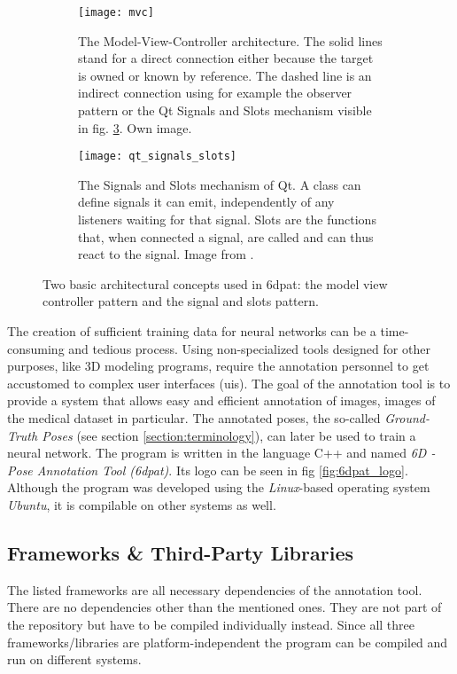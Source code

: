 \begin{figure}[!tbp]
	\centering
	\begin{subfigure}[t]{0.47\textwidth}
		\centering
    	\texttt{[image: mvc]}
    	\caption{The Model-View-Controller architecture. The solid lines stand for a direct connection either because the target is owned or known by reference. The dashed line is an indirect connection using for example the observer pattern or the Qt Signals and Slots mechanism visible in fig. \ref{fig:qt_signals_slots}. Own image.}
    	\label{fig:mvc}
	\end{subfigure}
	\hfill
	\begin{subfigure}[t]{0.47\textwidth}
	\centering
    	\texttt{[image: qt\_signals\_slots]}
    	\caption{The Signals and Slots mechanism of Qt. A class can define signals it can emit, independently of any listeners waiting for that signal. Slots are the functions that, when connected a signal, are called and can thus react to the signal. Image from \cite{qt_signals_and_slots}.}
    	\label{fig:qt_signals_slots}
	\end{subfigure}
	\caption{Two basic architectural concepts used in \gls{6dpat}: the model view controller pattern and the signal and slots pattern.}
\end{figure} 

The creation of sufficient training data for neural networks can be a time-consuming and tedious process. Using non-specialized tools designed for other purposes, like 3D modeling programs, require the annotation personnel to get accustomed to complex user interfaces (\gls{ui}s). The goal of the annotation tool is to provide a system that allows easy and efficient annotation of images, images of the medical dataset in particular. The annotated poses, the so-called \textit{Ground-Truth Poses} (see section \ref{section:terminology}), can later be used to train a neural network. The program is written in the language C++ and named \textit{6D - Pose Annotation Tool (\gls{6dpat})}. Its logo can be seen in fig \ref{fig:6dpat_logo}. Although the program was developed using the \textit{Linux}-based operating system \textit{Ubuntu}, it is compilable on other systems as well.

\subsection{Frameworks \& Third-Party Libraries}

The listed frameworks are all necessary dependencies of the annotation tool. There are no dependencies other than the mentioned ones. They are not part of the repository but have to be compiled individually instead. Since all three frameworks/libraries are platform-independent the program can be compiled and run on different systems. \\

